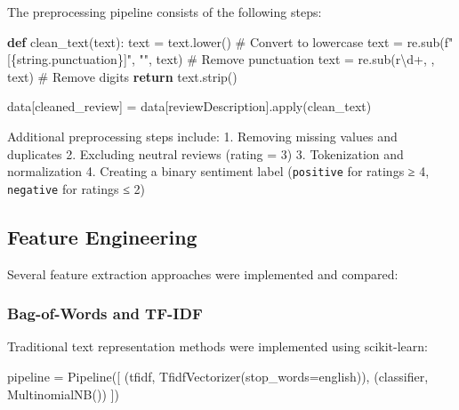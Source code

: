 \documentclass[
]{article}
\newenvironment{Shaded}{\begin{snugshade}}{\end{snugshade}}
\newcommand{\BuiltInTok}[1]{\textcolor[rgb]{0.00,0.23,0.31}{#1}}
\newcommand{\CommentTok}[1]{\textcolor[rgb]{0.37,0.37,0.37}{#1}}
\newcommand{\ControlFlowTok}[1]{\textcolor[rgb]{0.00,0.23,0.31}{\textbf{#1}}}
\newcommand{\KeywordTok}[1]{\textcolor[rgb]{0.00,0.23,0.31}{\textbf{#1}}}
\newcommand{\NormalTok}[1]{\textcolor[rgb]{0.00,0.23,0.31}{#1}}
\newcommand{\OperatorTok}[1]{\textcolor[rgb]{0.37,0.37,0.37}{#1}}
\newcommand{\SpecialCharTok}[1]{\textcolor[rgb]{0.37,0.37,0.37}{#1}}
\newcommand{\SpecialStringTok}[1]{\textcolor[rgb]{0.13,0.47,0.30}{#1}}
\newcommand{\StringTok}[1]{\textcolor[rgb]{0.13,0.47,0.30}{#1}}
\newcommand{\VerbatimStringTok}[1]{\textcolor[rgb]{0.13,0.47,0.30}{#1}}
\begin{document}
The preprocessing pipeline consists of the following steps:

\begin{Shaded}
\begin{Highlighting}[]
\KeywordTok{def}\NormalTok{ clean\_text(text):}
\NormalTok{    text }\OperatorTok{=}\NormalTok{ text.lower()  }\CommentTok{\# Convert to lowercase}
\NormalTok{    text }\OperatorTok{=}\NormalTok{ re.sub(}\SpecialStringTok{f"[}\SpecialCharTok{\{}\NormalTok{string}\SpecialCharTok{.}\NormalTok{punctuation}\SpecialCharTok{\}}\SpecialStringTok{]"}\NormalTok{, }\StringTok{""}\NormalTok{, text)  }\CommentTok{\# Remove punctuation}
\NormalTok{    text }\OperatorTok{=}\NormalTok{ re.sub(}\VerbatimStringTok{r\textquotesingle{}\textbackslash{}d+\textquotesingle{}}\NormalTok{, }\StringTok{\textquotesingle{}\textquotesingle{}}\NormalTok{, text)  }\CommentTok{\# Remove digits}
    \ControlFlowTok{return}\NormalTok{ text.strip()}

\NormalTok{data[}\StringTok{\textquotesingle{}cleaned\_review\textquotesingle{}}\NormalTok{] }\OperatorTok{=}\NormalTok{ data[}\StringTok{\textquotesingle{}reviewDescription\textquotesingle{}}\NormalTok{].}\BuiltInTok{apply}\NormalTok{(clean\_text)}
\end{Highlighting}
\end{Shaded}

Additional preprocessing steps include: 1. Removing missing values and
duplicates 2. Excluding neutral reviews (rating = 3) 3. Tokenization and
normalization 4. Creating a binary sentiment label (\texttt{positive}
for ratings ≥ 4, \texttt{negative} for ratings ≤ 2)

\subsection{Feature Engineering}\label{feature-engineering}

Several feature extraction approaches were implemented and compared:

\subsubsection{Bag-of-Words and TF-IDF}\label{bag-of-words-and-tf-idf}

Traditional text representation methods were implemented using
scikit-learn:

\begin{Shaded}
\begin{Highlighting}[]
\NormalTok{pipeline }\OperatorTok{=}\NormalTok{ Pipeline([}
\NormalTok{    (}\StringTok{\textquotesingle{}tfidf\textquotesingle{}}\NormalTok{, TfidfVectorizer(stop\_words}\OperatorTok{=}\StringTok{\textquotesingle{}english\textquotesingle{}}\NormalTok{)),}
\NormalTok{    (}\StringTok{\textquotesingle{}classifier\textquotesingle{}}\NormalTok{, MultinomialNB())}
\NormalTok{])}
\end{Highlighting}
\end{Shaded}
\end{document}
